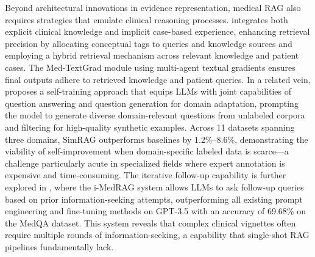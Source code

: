 \documentclass[11pt]{article}
\begin{document}
Beyond architectural innovations in evidence representation, medical RAG also requires strategies that emulate clinical reasoning processes. \cite{ref391} integrates both explicit clinical knowledge and implicit case-based experience, enhancing retrieval precision by allocating conceptual tags to queries and knowledge sources and employing a hybrid retrieval mechanism across relevant knowledge and patient cases. The Med-TextGrad module using multi-agent textual gradients ensures final outputs adhere to retrieved knowledge and patient queries. In a related vein, \cite{ref392} proposes a self-training approach that equips LLMs with joint capabilities of question answering and question generation for domain adaptation, prompting the model to generate diverse domain-relevant questions from unlabeled corpora and filtering for high-quality synthetic examples. Across 11 datasets spanning three domains, SimRAG outperforms baselines by 1.2\%--8.6\%, demonstrating the viability of self-improvement when domain-specific labeled data is scarce---a challenge particularly acute in specialized fields where expert annotation is expensive and time-consuming. The iterative follow-up capability is further explored in \cite{ref393}, where the i-MedRAG system allows LLMs to ask follow-up queries based on prior information-seeking attempts, outperforming all existing prompt engineering and fine-tuning methods on GPT-3.5 with an accuracy of 69.68\% on the MedQA dataset. This system reveals that complex clinical vignettes often require multiple rounds of information-seeking, a capability that single-shot RAG pipelines fundamentally lack.
\end{document}
